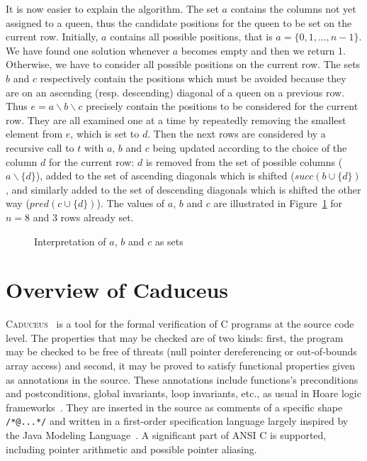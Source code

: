 \documentclass[a4paper]{llncs}
\newcommand{\caduceus}{\textsc{Caduceus}}
\begin{document}
It is now easier to explain the algorithm. The set $a$ contains the
columns not yet assigned to a queen, thus the candidate positions
for the queen to be set on the current row. Initially, $a$ contains
all possible positions, that is  $a = \{0,1,\dots,n-1\}$. 
We have found one solution whenever $a$ becomes empty and then we return 1.
Otherwise, we have to consider all possible positions on the current
row. The sets $b$ and $c$ respectively contain the positions which
must be avoided because they are on an ascending (resp. descending)
diagonal of a queen on a previous row.
Thus $e = a\backslash b\backslash c$ precisely contain the positions to be
considered for the current row. They are all examined one at a time by
repeatedly removing the smallest element from $e$, which is set to $d$.
Then the next rows are considered by a recursive call to $t$ with $a$,
$b$ and $c$ being updated according to the choice of the column $d$
for the current row: $d$ is removed from the set of possible columns
($a\backslash\{d\}$), added to the set of ascending diagonals which is
shifted ($\mathit{succ}(b\cup\{d\})$, and similarly  added to the set of
descending diagonals which is shifted the other way
($\mathit{pred}(c\cup\{d\})$). 
The values of $a$, $b$ and $c$ are illustrated in Figure~\ref{fig:abc}
for $n=8$ and 3 rows already set.

\begin{figure}
  \hspace*{-3em}
  \caption{Interpretation of $a$, $b$ and $c$ as sets}
  \label{fig:abc}
\end{figure}

\section{Overview of Caduceus}\label{caduceus}

\caduceus~\cite{caduceus,FilliatreMarche04} is a tool for the
formal verification of C programs at the source code level.
The properties that may be checked are of two kinds: first, the
program may be checked to be free of threats (null pointer
dereferencing or out-of-bounds array access) and second, it may be
proved to satisfy functional properties given as annotations in the
source. These annotations include functions's preconditions and
postconditions, global invariants, loop invariants, etc., as usual in
Hoare logic frameworks~\cite{Hoare69}.
They are inserted in the source as comments of
a specific shape \texttt{/*@...*/} and written in a first-order specification
language largely inspired by the Java Modeling Language~\cite{JML}.
A significant part of ANSI C is supported, including pointer
arithmetic and possible pointer aliasing.
\end{document}
